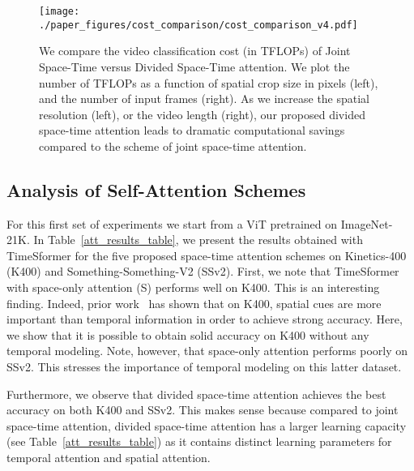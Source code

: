 \documentclass{article}
\begin{document}
\begin{figure}
\begin{center}
   \texttt{[image: ./paper\_figures/cost\_comparison/cost\_comparison\_v4.pdf]}
\end{center}
\vspace{-0.4cm}
        \caption{We compare the video classification cost (in TFLOPs) of Joint Space-Time versus Divided Space-Time attention. We plot the number of TFLOPs as a function of spatial crop size in pixels (left), and the number of input frames (right). As we increase the spatial resolution (left), or the video length (right), our proposed divided space-time attention leads to dramatic computational savings compared to the scheme of joint space-time attention. \vspace{-0.4cm}}
\label{cost_comparison_fig}
\end{figure}



\subsection{Analysis of Self-Attention Schemes}
\label{attn_sec}

For this first set of experiments we start from a ViT pretrained on ImageNet-21K. In Table~\ref{att_results_table}, we present the results obtained with TimeSformer for the five proposed space-time attention schemes on Kinetics-400 (K400) and Something-Something-V2 (SSv2). First, we note that TimeSformer with space-only attention (S) performs well on K400. This is an interesting finding. Indeed, prior work~\cite{Sevilla-Lara_2021_WACV} has shown that on K400, spatial cues are more important than temporal information in order to achieve strong accuracy. Here, we show that it is possible to obtain solid accuracy on K400 without any temporal modeling. Note, however, that space-only attention performs poorly on SSv2. This stresses the importance of temporal modeling on this latter dataset.







Furthermore, we observe that divided space-time attention achieves the best accuracy on both K400 and SSv2. This makes sense because compared to joint space-time attention, divided space-time attention has a larger learning capacity (see Table~\ref{att_results_table}) as it contains distinct learning parameters for temporal attention and spatial attention. 
\end{document}
